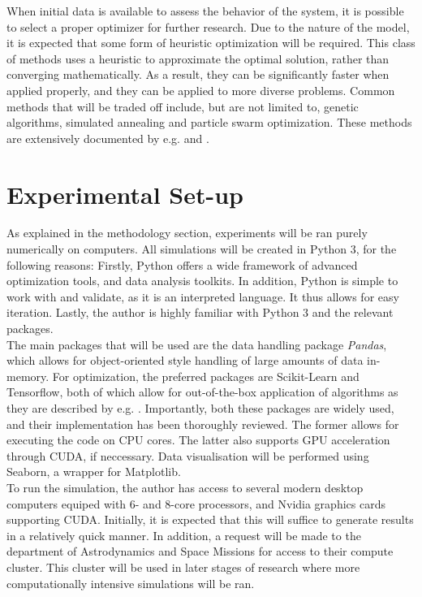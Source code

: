 \documentclass[12pt, english, NoHyper]{AE4010-template}
\begin{document}
When initial data is available to assess the behavior of the system, it is possible to select a proper optimizer for further research. Due to the nature of the model, it is expected that some form of heuristic optimization will be required. This class of methods uses a heuristic to approximate the optimal solution, rather than converging mathematically. As a result, they can be significantly faster when applied properly, and they can be applied to more diverse problems. Common methods that will be traded off include, but are not limited to, genetic algorithms, simulated annealing and particle swarm optimization. These methods are extensively documented by e.g. \cite{DLTwo} and \cite{DLOne}.


\section{Experimental Set-up}
As explained in the methodology section, experiments will be ran purely numerically on computers. All simulations will be created in Python 3, for the following reasons: Firstly, Python offers a wide framework of advanced optimization tools, and data analysis toolkits. In addition, Python is simple to work with and validate, as it is an interpreted language. It thus allows for easy iteration. Lastly, the author is highly familiar with Python 3 and the relevant packages. \\

The main packages that will be used are the data handling package \textit{Pandas}, which allows for object-oriented style handling of large amounts of data in-memory. For optimization, the preferred packages are Scikit-Learn and Tensorflow, both of which allow for out-of-the-box application of algorithms as they are described by e.g. \cite{DLOne}. Importantly, both these packages are widely used, and their implementation has been thoroughly reviewed. The former allows for executing the code on CPU cores. The latter also supports GPU acceleration through CUDA, if neccessary. Data visualisation will be performed using Seaborn, a wrapper for Matplotlib. \\

To run the simulation, the author has access to several modern desktop computers equiped with 6- and 8-core processors, and Nvidia graphics cards supporting CUDA. Initially, it is expected that this will suffice to generate results in a relatively quick manner. In addition, a request will be made to the department of Astrodynamics and Space Missions for access to their compute cluster. This cluster will be used in later stages of research where more computationally intensive simulations will be ran.
\end{document}
